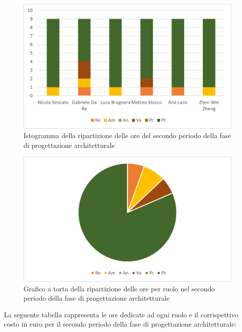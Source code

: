 \begin{figure}[H]
    \centering
    \includegraphics[scale=0.6]{img/grafi preventivo/istogrammi/architetturale/periodo2.png}
    \caption{Istogramma della ripartizione delle ore del secondo periodo della fase di progettazione architetturale}
\end{figure}
\begin{figure}[H]
    \centering
    \includegraphics[scale=0.6]{img/grafi preventivo/torta/architetturale/periodo2.png}
    \caption{Grafico a torta della ripartizione delle ore per ruolo nel secondo periodo della fase di progettazione architetturale}
\end{figure}
La seguente tabella rappresenta le ore dedicate ad ogni ruolo e il corrispettivo costo in euro per il secondo periodo della fase di progettazione architetturale:

